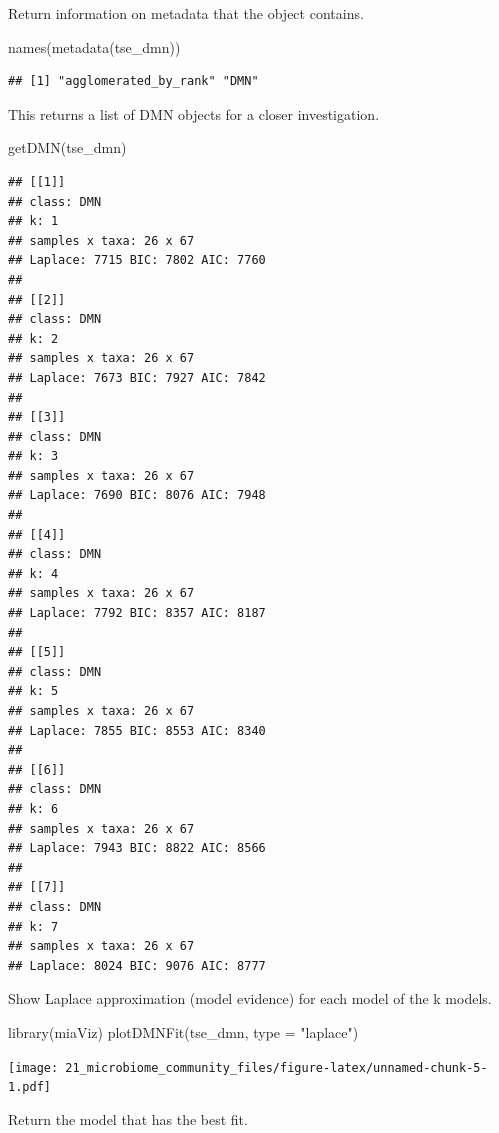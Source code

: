 \documentclass[
]{book}
\newenvironment{Shaded}{\begin{snugshade}}{\end{snugshade}}
\newcommand{\AttributeTok}[1]{\textcolor[rgb]{0.77,0.63,0.00}{#1}}
\newcommand{\FunctionTok}[1]{\textcolor[rgb]{0.00,0.00,0.00}{#1}}
\newcommand{\NormalTok}[1]{#1}
\newcommand{\StringTok}[1]{\textcolor[rgb]{0.31,0.60,0.02}{#1}}
\begin{document}
Return information on metadata that the object contains.

\begin{Shaded}
\begin{Highlighting}[]
\FunctionTok{names}\NormalTok{(}\FunctionTok{metadata}\NormalTok{(tse\_dmn))}
\end{Highlighting}
\end{Shaded}

\begin{verbatim}
## [1] "agglomerated_by_rank" "DMN"
\end{verbatim}

This returns a list of DMN objects for a closer investigation.

\begin{Shaded}
\begin{Highlighting}[]
\FunctionTok{getDMN}\NormalTok{(tse\_dmn)}
\end{Highlighting}
\end{Shaded}

\begin{verbatim}
## [[1]]
## class: DMN 
## k: 1 
## samples x taxa: 26 x 67 
## Laplace: 7715 BIC: 7802 AIC: 7760 
## 
## [[2]]
## class: DMN 
## k: 2 
## samples x taxa: 26 x 67 
## Laplace: 7673 BIC: 7927 AIC: 7842 
## 
## [[3]]
## class: DMN 
## k: 3 
## samples x taxa: 26 x 67 
## Laplace: 7690 BIC: 8076 AIC: 7948 
## 
## [[4]]
## class: DMN 
## k: 4 
## samples x taxa: 26 x 67 
## Laplace: 7792 BIC: 8357 AIC: 8187 
## 
## [[5]]
## class: DMN 
## k: 5 
## samples x taxa: 26 x 67 
## Laplace: 7855 BIC: 8553 AIC: 8340 
## 
## [[6]]
## class: DMN 
## k: 6 
## samples x taxa: 26 x 67 
## Laplace: 7943 BIC: 8822 AIC: 8566 
## 
## [[7]]
## class: DMN 
## k: 7 
## samples x taxa: 26 x 67 
## Laplace: 8024 BIC: 9076 AIC: 8777
\end{verbatim}

Show Laplace approximation (model evidence) for each model of the k models.

\begin{Shaded}
\begin{Highlighting}[]
\FunctionTok{library}\NormalTok{(miaViz)}
\FunctionTok{plotDMNFit}\NormalTok{(tse\_dmn, }\AttributeTok{type =} \StringTok{"laplace"}\NormalTok{)}
\end{Highlighting}
\end{Shaded}

\texttt{[image: 21\_microbiome\_community\_files/figure-latex/unnamed-chunk-5-1.pdf]}

Return the model that has the best fit.
\end{document}
